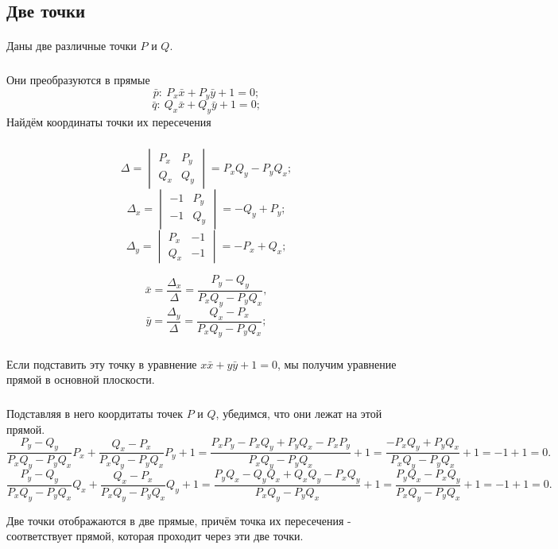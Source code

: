 \subsection{Две точки}
\paragraph{}Даны две различные точки $P$ и $Q$.
\subparagraph{}Они преобразуются в прямые
$$\bar{p}:\: P_x \bar{x} + P_y \bar{y} + 1 = 0;$$
$$\bar{q}:\: Q_x \bar{x} + Q_y \bar{y} + 1 = 0;$$
Найдём координаты точки их пересечения
\subparagraph{}
\begin{minipage}{0.4\textwidth}
$$\Delta =
\begin{vmatrix}
	P_x & P_y \\
	Q_x & Q_y
\end{vmatrix}
= P_x Q_y - P_y Q_x;
$$
$$
\Delta_x =
\begin{vmatrix}
	-1 & P_y \\
	-1 & Q_y 
\end{vmatrix}
= - Q_y + P_y;
$$
$$
\Delta_y =
\begin{vmatrix}
	P_x & -1 \\
	Q_x & -1
\end{vmatrix}
= - P_x + Q_x;
$$
\end{minipage}
\begin{minipage}{0.4\textwidth}
$$\bar{x} = \frac{\Delta_x}{\Delta} = \frac{P_y - Q_y}{P_x Q_y - P_y Q_x},$$
$$\bar{y} = \frac{\Delta_y}{\Delta} = \frac{Q_x - P_x}{P_x Q_y - P_y Q_x};$$
\end{minipage}
\subparagraph{} Если подставить эту точку в уравнение $x\bar{x} + y\bar{y} + 1 = 0$, мы получим уравнение прямой в основной плоскости.
\subparagraph{} Подставляя в него коордитаты точек $P$ и $Q$, убедимся, что они лежат на этой прямой.
$$\frac{P_y - Q_y}{P_x Q_y - P_y Q_x}P_x + \frac{Q_x - P_x}{P_x Q_y - P_y Q_x}P_y + 1 
= \frac{P_x P_y - P_x Q_y + P_y Q_x - P_x P_y}{P_x Q_y - P_y Q_x} + 1 
= \frac{- P_x Q_y + P_y Q_x}{P_x Q_y - P_y Q_x} + 1 
= -1 + 1 = 0.$$
$$\frac{P_y - Q_y}{P_x Q_y - P_y Q_x}Q_x + \frac{Q_x - P_x}{P_x Q_y - P_y Q_x}Q_y + 1 
= \frac{P_yQ_x - Q_yQ_x + Q_x Q_y- P_xQ_y}{P_x Q_y - P_y Q_x} + 1 
= \frac{P_yQ_x - P_xQ_y}{P_x Q_y - P_y Q_x} + 1 
= -1 + 1 =0.$$

Две точки отображаются в две прямые, причём точка их пересечения - соответствует прямой, которая проходит через эти две точки.
